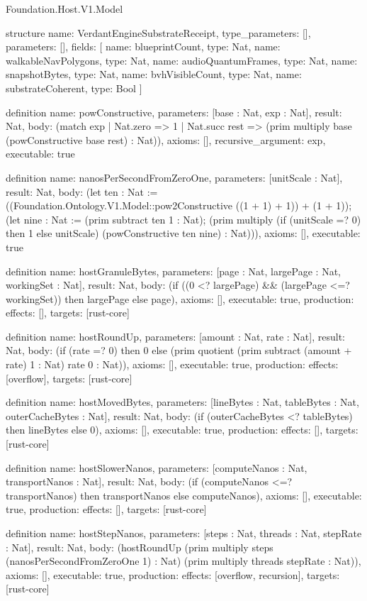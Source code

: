 \begin{lexlean}{Foundation.Host.V1.Model}
\begin{semanticmodule}
structure{
  name: VerdantEngineSubstrateReceipt,
  type_parameters: [],
  parameters: [],
  fields: [
    {name: blueprintCount, type: Nat},
    {name: walkableNavPolygons, type: Nat},
    {name: audioQuantumFrames, type: Nat},
    {name: snapshotBytes, type: Nat},
    {name: bvhVisibleCount, type: Nat},
    {name: substrateCoherent, type: Bool}
  ]
}

definition{
  name: powConstructive,
  parameters: [base : Nat, exp : Nat],
  result: Nat,
  body: (match exp
    | Nat.zero => 1
    | Nat.succ rest => (prim multiply base (powConstructive base rest) : Nat)),
  axioms: [],
  recursive_argument: exp,
  executable: true
}

definition{
  name: nanosPerSecondFromZeroOne,
  parameters: [unitScale : Nat],
  result: Nat,
  body: (let ten : Nat := ((Foundation.Ontology.V1.Model::pow2Constructive ((1 + 1) + 1)) + (1 + 1)); (let nine : Nat := (prim subtract ten 1 : Nat); (prim multiply (if (unitScale =? 0) then 1 else unitScale) (powConstructive ten nine) : Nat))),
  axioms: [],
  executable: true
}

definition{
  name: hostGranuleBytes,
  parameters: [page : Nat, largePage : Nat, workingSet : Nat],
  result: Nat,
  body: (if ((0 <? largePage) && (largePage <=? workingSet)) then largePage else page),
  axioms: [],
  executable: true,
  production: {effects: [], targets: [rust-core]}
}

definition{
  name: hostRoundUp,
  parameters: [amount : Nat, rate : Nat],
  result: Nat,
  body: (if (rate =? 0) then 0 else (prim quotient (prim subtract (amount + rate) 1 : Nat) rate 0 : Nat)),
  axioms: [],
  executable: true,
  production: {effects: [overflow], targets: [rust-core]}
}

definition{
  name: hostMovedBytes,
  parameters: [lineBytes : Nat, tableBytes : Nat, outerCacheBytes : Nat],
  result: Nat,
  body: (if (outerCacheBytes <? tableBytes) then lineBytes else 0),
  axioms: [],
  executable: true,
  production: {effects: [], targets: [rust-core]}
}

definition{
  name: hostSlowerNanos,
  parameters: [computeNanos : Nat, transportNanos : Nat],
  result: Nat,
  body: (if (computeNanos <=? transportNanos) then transportNanos else computeNanos),
  axioms: [],
  executable: true,
  production: {effects: [], targets: [rust-core]}
}

definition{
  name: hostStepNanos,
  parameters: [steps : Nat, threads : Nat, stepRate : Nat],
  result: Nat,
  body: (hostRoundUp (prim multiply steps (nanosPerSecondFromZeroOne 1) : Nat) (prim multiply threads stepRate : Nat)),
  axioms: [],
  executable: true,
  production: {effects: [overflow, recursion], targets: [rust-core]}
}


\end{semanticmodule}
\end{lexlean}
